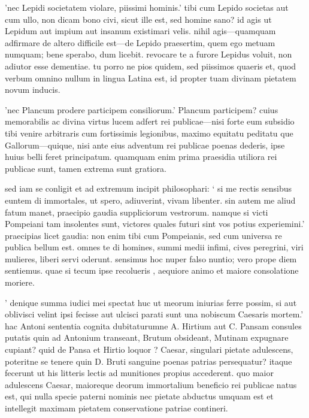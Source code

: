  'nec Lepidi societatem violare, piissimi hominis.' tibi cum Lepido societas aut cum ullo, non dicam bono civi, sicut ille est, sed homine sano? id agis ut Lepidum aut impium aut insanum existimari velis. nihil agis—quamquam adfirmare de altero difficile est—de Lepido praesertim, quem ego metuam numquam; bene sperabo, dum licebit. revocare te a furore Lepidus voluit, non adiutor esse dementiae. tu porro ne pios quidem, sed piissimos quaeris et, quod verbum omnino nullum in lingua Latina est, id propter tuam divinam pietatem novum inducis.

 'nec Plancum prodere participem consiliorum.' Plancum participem? cuius memorabilis ac divina virtus lucem adfert rei publicae—nisi forte eum subsidio tibi venire arbitraris cum fortissimis legionibus, maximo equitatu peditatu que Gallorum—quique, nisi ante eius adventum rei publicae poenas dederis, ipse huius belli feret principatum. quamquam enim prima praesidia utiliora rei publicae sunt, tamen extrema sunt gratiora.

 sed iam se conligit et ad extremum incipit philosophari: ` si me rectis sensibus euntem di immortales, ut spero, adiuverint, vivam libenter. sin autem me aliud fatum manet, praecipio gaudia suppliciorum vestrorum. namque si victi Pompeiani tam insolentes sunt, victores quales futuri sint vos potius experiemini.' praecipias licet gaudia: non enim tibi cum Pompeianis, sed cum universa re publica bellum est. omnes te di homines, summi medii infimi, cives peregrini, viri mulieres, liberi servi oderunt. sensimus hoc nuper falso nuntio; vero prope diem sentiemus. quae si tecum ipse recolueris , aequiore animo et maiore consolatione moriere.

 ' denique summa iudici mei spectat huc ut meorum iniurias ferre possim, si aut oblivisci velint ipsi fecisse aut ulcisci parati sunt una nobiscum Caesaris mortem.' hac Antoni sententia cognita dubitaturumne A. Hirtium aut C. Pansam consules putatis quin ad Antonium transeant, Brutum obsideant, Mutinam expugnare cupiant? quid de Pansa et Hirtio loquor ? Caesar, singulari pietate adulescens, poteritne se tenere quin D. Bruti sanguine poenas patrias persequatur? itaque fecerunt ut his litteris lectis ad munitiones propius accederent. quo maior adulescens Caesar, maioreque deorum immortalium beneficio rei publicae natus est, qui nulla specie paterni nominis nec pietate abductus umquam est et intellegit maximam pietatem conservatione patriae contineri.

